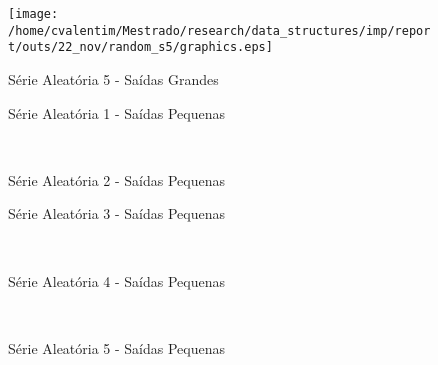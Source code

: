 \documentclass[12pt]{article}
\begin{document}
\begin{figure}
\begin{center}
\texttt{[image: /home/cvalentim/Mestrado/research/data\_structures/imp/report/outs/22\_nov/random\_s5/graphics.eps]}
\caption{Série Aleatória 5 - Saídas Grandes}
\end{center}
\end{figure}

\clearpage
\begin{figure}
\begin{center}

\caption{Série Aleatória 1 - Saídas Pequenas}
\label{1-small-random}
\end{center}
\end{figure}

\begin{figure}
\begin{center}
\\
\caption{Série Aleatória 2 - Saídas Pequenas}
\label{2-small-random}
\end{center}
\end{figure}


\begin{figure}
\begin{center}

\label{3-small-random}
\caption{Série Aleatória 3 - Saídas Pequenas}
\end{center}
\end{figure}

\begin{figure}
\begin{center}
 \\
\label{4-small-random}
\caption{Série Aleatória 4 - Saídas Pequenas}
\end{center}
\end{figure}


\begin{figure}
\begin{center}
\\
\caption{Série Aleatória 5 - Saídas Pequenas}
\label{5-small-random}
\end{center}
\end{figure}
\end{document}
